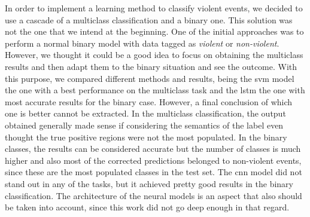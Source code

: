 	In order to implement a learning method to classify violent events, we decided to use a cascade of a multiclass classification and a binary one. This solution was not the one that we intend at the beginning. %
	One of the initial approaches was to perform a normal binary model with data tagged as \textit{violent} or \textit{non-violent}. However, we thought it could be a good idea to focus on obtaining the multiclass results and then adapt them to the binary situation and see the outcome. With this purpose, we compared different methods and results, being the \acrshort{svm} model the one with a best performance on the multiclass task and the \acrshort{lstm} the one with most accurate results for the binary case. However, a final conclusion of which one is better cannot be extracted. In the multiclass classification, the output obtained generally made sense if considering the semantics of the label even thought the true positive regions were not the most populated. In the binary classes, the results can be considered accurate but the number of classes is much higher and also most of the corrected predictions belonged to non-violent events, since these are the most populated classes in the test set. The \acrshort{cnn} model did not stand out in any of the tasks, but it achieved pretty good results in the binary classification. The architecture of the neural models is an aspect that also should be taken into account, since this work did not go deep enough in that regard.
